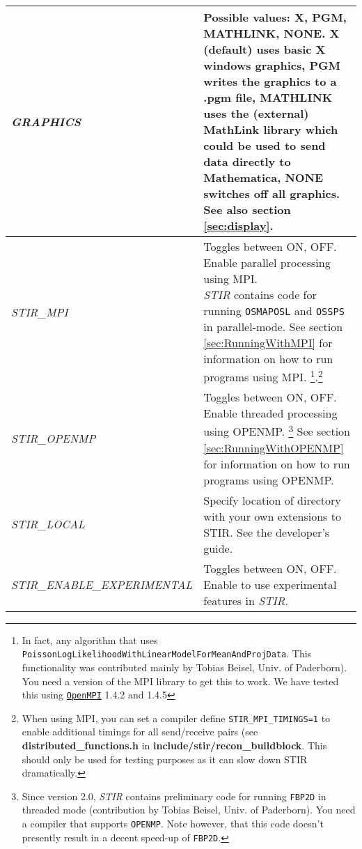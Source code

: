 \documentclass{article}
\def\url#1#2{\mbox{\href{#1}{\tt #2}}}
\begin{document}
\newlength{\MakeTableFirstCol}
\newlength{\MakeTableSecondCol}
\setlength{\MakeTableFirstCol}{1.5in}
\setlength{\MakeTableSecondCol}{\textwidth}
\addtolength{\MakeTableSecondCol}{-\MakeTableFirstCol}

\begin{longtable}{|p{\MakeTableFirstCol}|p{\MakeTableSecondCol}|}
\hline
{\raggedright \textit{GRAPHICS}} & 
{\raggedright Possible values: X, PGM, MATHLINK, NONE. X (default) uses basic 
X windows graphics, PGM writes the graphics to a .pgm file, MATHLINK 
uses the (external) MathLink library which could be used to send 
data directly to Mathematica, NONE switches off all graphics. See also section \ref{sec:display}.
} \\
\hline
{\raggedright \textit{STIR\_MPI}} & 
{\raggedright Toggles between ON, OFF. Enable parallel processing using MPI.\\
\textit{STIR} contains code for running \texttt{OSMAPOSL} and \texttt{OSSPS} in parallel-mode. 
See section \ref{sec:RunningWithMPI} for information on how to run programs using MPI.
\footnote{In fact, any algorithm that uses \texttt{PoissonLogLikelihoodWithLinearModelForMeanAndProjData}.
This functionality was contributed mainly by Tobias Beisel, Univ. of Paderborn). You need a version of the MPI library 
to get this to work. We have tested this using \url{http://www.open-mpi.org/}{OpenMPI} 1.4.2 and 1.4.5}.\footnote{
{When using MPI, you can set a compiler define \texttt{STIR\_MPI\_TIMINGS=1}} to
enable additional timings for all send/receive pairs 
(see \textbf{distributed\_functions.h} in \textbf{include/stir/recon\_buildblock}. 
This should only be used for testing purposes as it can slow down
STIR dramatically.}
} \\
\hline
{\raggedright \textit{STIR\_OPENMP}} & 
{\raggedright Toggles between ON, OFF. Enable threaded processing using OPENMP.
\footnote{Since version 2.0, \textit{STIR} contains preliminary code for running \texttt{FBP2D} in threaded mode
(contribution by Tobias Beisel, Univ. of Paderborn). You need a compiler that 
supports \texttt{OPENMP}. Note however, that this code doesn't presently result 
in a decent speed-up of \texttt{FBP2D}.}
See section \ref{sec:RunningWithOPENMP} for information on how to run programs using OPENMP.
} \\
\hline
{\raggedright \textit{STIR\_LOCAL}} & 
{\raggedright Specify location of directory with your own extensions to STIR. See
the developer's guide.}\\
\hline
{\raggedright \textit{STIR\_ENABLE\_EXPERIMENTAL}} & 
{\raggedright Toggles between ON, OFF. Enable to use experimental features in \textit{STIR}.}\\
\hline
\end{longtable}
\end{document}
